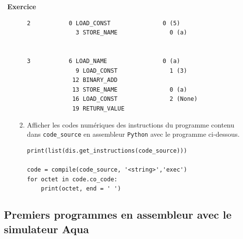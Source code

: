 \documentclass[a4paper, french, 11pt]{article}  %
\newcounter{exercice}
\newenvironment{exercice}[1]
{\par \medskip   \addtocounter{exercice}{1} \noindent  
\begin{bclogo}[arrondi =0.1,   noborder = true, logo=\bccrayon, marge=4]{~\textbf{Exercice} \textbf{\theexercice} {\itshape #1} }  \par}
{
\end{bclogo}
 \par \bigskip }
\newcounter{prog}
\begin{document}
\begin{exercice}{}
\begin{enumerate}
\begin{enumerate}
\begin{lstlisting}[style=compil]
2           0 LOAD_CONST               0 (5)
              3 STORE_NAME               0 (a)


3           6 LOAD_NAME                0 (a)
              9 LOAD_CONST               1 (3)
             12 BINARY_ADD
             13 STORE_NAME               0 (a)
             16 LOAD_CONST               2 (None)
             19 RETURN_VALUE
\end{lstlisting}

\item Afficher les codes numériques des instructions du programme contenu dans \verb+code_source+ en  assembleur \texttt{Python} avec le programme ci-dessous.

\begin{lstlisting}[style=rond]
print(list(dis.get_instructions(code_source)))

code = compile(code_source, '<string>','exec')
for octet in code.co_code:
    print(octet, end = ' ')
\end{lstlisting}

\end{enumerate}

\end{enumerate}
\end{exercice}





\subsection{Premiers programmes en assembleur avec le simulateur Aqua}
\end{document}
